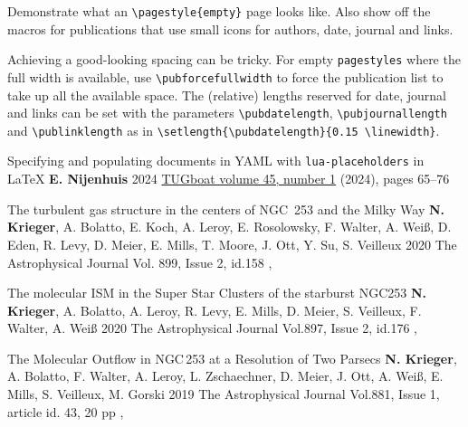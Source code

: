\documentclass[%
               doublesided,
               paper=a4,
               fontsize=10pt
              ]{my-resume}
\begin{document}
Demonstrate what an \texttt{\textbackslash pagestyle\{empty\}} page looks like.
Also show off the macros for publications that use small icons for authors, date, journal and links.

Achieving a good-looking spacing can be tricky.
For empty \texttt{pagestyles} where the full width is available, use \texttt{\textbackslash pubforcefullwidth} to force the publication list to take up all the available space.
The (relative) lengths reserved for date, journal and links can be set with the parameters \texttt{\textbackslash pubdatelength}, \texttt{\textbackslash pubjournallength} and \texttt{\textbackslash publinklength} as in \texttt{\textbackslash setlength\{\textbackslash pubdatelength\}\{0.15 \textbackslash linewidth\}}.
\bigskip

\publication
    {Specifying and populating documents in YAML with \texttt{lua-placeholders} in \LaTeX}
    {\textbf{E. Nijenhuis}}
    {2024}
    {\href{https://tug.org/TUGboat/tb45-1/}{TUGboat
volume 45, number 1} (2024),
pages 65--76}
    {}

\publication
	{The turbulent gas structure in the centers of NGC~253 and the Milky Way} %
	{\textbf{N. Krieger}, A. Bolatto, E. Koch, A. Leroy, E. Rosolowsky, F. Walter, A. Wei\ss, D. Eden, R. Levy, D. Meier, E. Mills, T. Moore, J. Ott, Y. Su, S. Veilleux} %
	{2020} %
	{The Astrophysical Journal Vol. 899, Issue 2, id.158} %
	{, } %

\publication
	{The molecular ISM in the Super Star Clusters of the starburst NGC253} %
	{\textbf{N. Krieger}, A. Bolatto, A. Leroy, R. Levy, E. Mills, D. Meier, S. Veilleux, F. Walter, A. Wei\ss} %
	{2020} %
	{The Astrophysical Journal Vol.897, Issue 2, id.176} %
	{, } %

\publication
	{The Molecular Outflow in NGC\,253 at a Resolution of Two Parsecs} %
	{\textbf{N. Krieger}, A. Bolatto, F. Walter, A. Leroy, L. Zschaechner, D. Meier, J. Ott, A. Wei\ss, E. Mills, S. Veilleux, M. Gorski} %
	{2019} %
	{The Astrophysical Journal Vol.881, Issue 1, article id. 43, 20 pp} %
	{, } %
\end{document}
